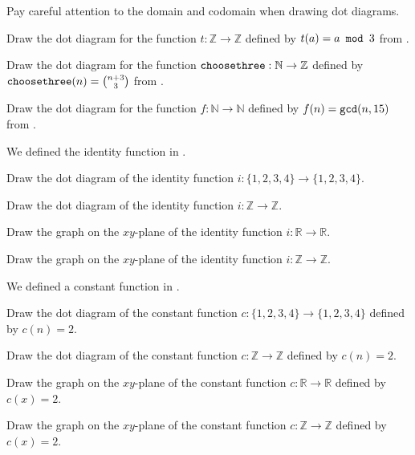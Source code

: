 \begin{exer}[\exerU] %
\label{exer_fn_numbthy_dotdiagram}
    Pay careful attention to the domain and codomain when drawing dot diagrams.
        \begin{exerpart}
            \item Draw the dot diagram for the function $t: \mathbb{Z} \to \mathbb{Z}$ defined by $t(a) = a \texttt{ mod } 3$ from .
            \item Draw the dot diagram for the function $\texttt{choosethree}: \mathbb{N} \to \mathbb{Z}$ defined by $\texttt{choosethree}(n) = \binom{n+3}{3}$ from .
            \item Draw the dot diagram for the function  $f: \mathbb{N} \to \mathbb{N}$ defined by $f(n) = \texttt{gcd}(n,15)$ from .
        \end{exerpart}
\end{exer}

\begin{exer}[\exerU] %
\label{exer_graphing_identity_function}     
    We defined the identity function in .
        \begin{exerpart}
            \item Draw the dot diagram of the identity function $i:\{1,2,3,4\} \to \{1,2,3,4\}$.
            \item Draw the dot diagram of the identity function $i: \mathbb{Z} \to \mathbb{Z}$.
            \item Draw the graph on the $xy$-plane of the identity function $i: \mathbb{R} \to \mathbb{R}$.
            \item Draw the graph on the $xy$-plane of the identity function $i: \mathbb{Z} \to \mathbb{Z}$.
    \end{exerpart}
\end{exer}

\begin{exer}[\exerU] %
\label{exer_graphing_constant}  
We defined a constant function in .
    \begin{exerpart}
        \item Draw the dot diagram of the constant function $c:\{1,2,3,4\} \to \{1,2,3,4\}$ defined by $c(n)=2$.
        \item Draw the dot diagram of the constant function $c:\mathbb{Z} \to \mathbb{Z}$ defined by $c(n)=2$.
        \item Draw the graph on the $xy$-plane of the constant function $c: \mathbb{R} \to \mathbb{R}$ defined by $c(x)=2$.
        \item Draw the graph on the $xy$-plane of the constant function $c: \mathbb{Z} \to \mathbb{Z}$ defined by $c(x)=2$.
    \end{exerpart}
\end{exer}

